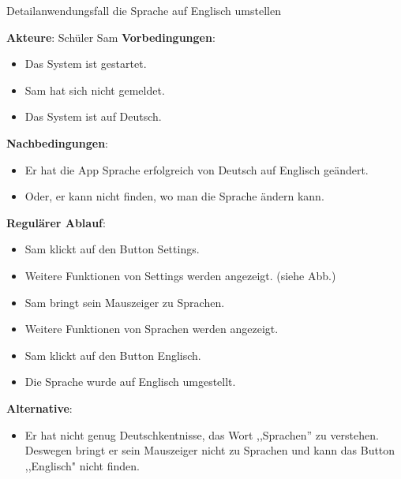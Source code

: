 \begin{answer}
    Detailanwendungsfall die Sprache auf Englisch umstellen 
\end{answer}
\newline
\textbf{Akteure}: Schüler Sam
\newline
\textbf{Vorbedingungen}: 
\begin{itemize}  
    \item Das System ist gestartet.
    \item Sam hat sich nicht gemeldet.
   \item Das System ist auf Deutsch.
\end{itemize} 
\textbf{Nachbedingungen}: 
\begin{itemize}  
    \item Er hat die App Sprache erfolgreich von Deutsch auf Englisch geändert.
   \item Oder, er kann nicht finden, wo man die Sprache ändern kann.\\
\end{itemize}
\textbf{Regulärer Ablauf}: 
\begin{itemize}  
    \item Sam klickt auf den Button Settings.
   \item Weitere Funktionen von Settings werden angezeigt. (siehe Abb.)
   \item Sam bringt sein Mauszeiger zu Sprachen.
    \item Weitere Funktionen von Sprachen werden angezeigt.
    \item Sam klickt auf den Button Englisch.
     \item Die Sprache wurde auf Englisch umgestellt.
\end{itemize}
\textbf{Alternative}: 
\begin{itemize}  
    \item Er hat nicht genug Deutschkentnisse, das Wort ,,Sprachen'' zu verstehen. Deswegen bringt er sein Mauszeiger nicht zu Sprachen und kann das Button ,,Englisch" nicht finden.
\end{itemize} 
